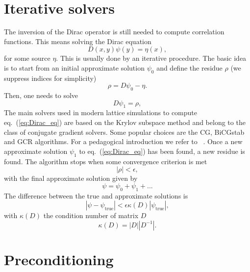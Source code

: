 \section{Iterative solvers}

The inversion of the Dirac operator is still needed to compute correlation functions. This means solving the Dirac equation
\begin{equation}
D(x,y)\psi(y)=\eta(x),
\end{equation}
for some source $\eta$. This is usually done by an iterative procedure. The basic idea is to start from an initial approximate solution $\psi_0$ and define the residue $\rho$ (we suppress indices for simplicity)
\begin{equation}
\rho=D\psi_0-\eta.
\end{equation}
Then, one needs to solve
\begin{equation}
\label{eq:Dirac_eq}
D\psi_1=\rho,
\end{equation}
The main solvers used in modern lattice simulations to compute eq.~(\ref{eq:Dirac_eq}) are based on the Krylov subspace method and belong to the class of conjugate gradient solvers. Some popular choices are the CG, BiCGstab and GCR algorithms. For a pedagogical introduction we refer to ~\citep{Gattringer_Lang_2010,Luscher:2010ae}. Once a new approximate solution $\psi_1$ to eq.~(\ref{eq:Dirac_eq}) has been found, a new residue is found. The algorithm stops when some convergence criterion is met
\begin{equation}
|\rho|<\epsilon,
\end{equation}
with the final approximate solution given by
\begin{equation}
\psi=\psi_0+\psi_1+...
\end{equation}
The difference between the true and approximate solutions is
\begin{equation}
|\psi-\psi_{\textrm{true}}|<\epsilon\kappa(D)|\psi_{\textrm{true}}|,
\end{equation}
with $\kappa(D)$ the condition number of matrix $D$
\begin{equation}
\kappa(D)=|D||D^{-1}|.
\end{equation}

\section{Preconditioning}

